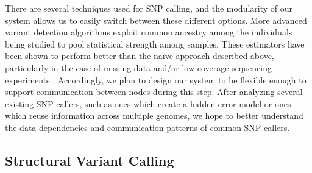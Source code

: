 \documentclass[10pt]{article}
\begin{document}
There are several techniques used for SNP calling,
and the modularity of our system allows us to easily switch between these
different options.  More advanced variant detection algorithms exploit common
ancestry among the individuals being studied to pool statistical strength among
samples.  These estimators have been shown to perform better than the na\"{i}ve
approach described above, particularly in the case of missing data and/or low
coverage sequencing experiments \cite{nielsen}.  Accordingly, we plan to design
our system to be flexible enough to support communication between nodes during
this step.  After analyzing several existing SNP callers, such as ones which
create a hidden error model or ones which reuse information across multiple
genomes, we hope to better understand the data dependencies and communication
patterns of common SNP callers.  


\subsection{Structural Variant Calling}
\end{document}
